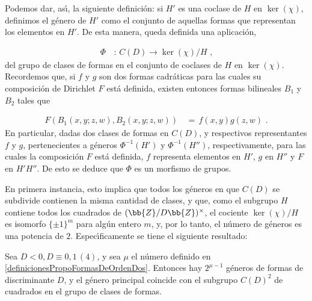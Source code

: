 Podemos dar, as\'{\i}, la siguiente definici\'{o}n: si $H'$ es una
coclase de $H$ en $\ker(\chi)$, definimos el g\'{e}nero de $H'$ como
el conjunto de aquellas formas que representan los elementos en $H'$.
De esta manera, queda definida una aplicaci\'{o}n,

\begin{align*}
\Phi & \,:\,C(D)\rightarrow\ker(\chi)/H\text{ ,}
\end{align*}
del grupo de clases de formas en el conjunto de coclases de $H$ en
$\ker(\chi)$. Recordemos que, si $f$ y $g$ son dos formas
cadr\'{a}ticas para las cuales su composici\'{o}n de Dirichlet $F$
est\'{a} definida, existen entonces formas bilineales $B_{1}$ y $B_{2}$
tales que

\begin{align*}
F(B_{1}(x,y;z,w),B_{2}(x,y;z,w)) & \,=\,f(x,y)g(z,w)\text{ .}
\end{align*}
En particular, dadas dos clases de formas en $C(D)$, y respectivos representantes $f$ y $g$, pertenecientes a g\'{e}neros
$\Phi^{-1}(H')$ y $\Phi^{-1}(H'')$, respectivamente, para las cuales
la composici\'{o}n $F$ est\'{a} definida, $f$ representa elementos en
$H'$, $g$ en $H''$ y $F$ en $H'H''$. De esto se deduce que $\Phi$ es
un morfismo de grupos.

En primera instancia, esto implica que todos los g\'{e}neros en que
$C(D)$ se subdivide contienen la misma cantidad de clases, y que,
como el subgrupo $H$ contiene todos los cuadrados de
$(\bb{Z}/D\bb{Z})^{\times}$, %
el cociente $\ker(\chi)/H$ es isomorfo $\{\pm 1\}^{m}$ para
alg\'{u}n entero $m$, y, por lo tanto, el n\'{u}mero de g\'{e}neros es
una potencia de $2$.
Espec\'{\i}ficamente se tiene el siguiente resultado:

\begin{definicionesGeneraYCuadrados}
Sea $D<0,D\equiv 0,1\,(4)$, y sea $\mu$ el n\'{u}mero definido en
\ref{definicionesPropoFormasDeOrdenDos}. Entonces hay $2^{\mu-1}$
g\'{e}neros de formas de discriminante $D$, y el g\'{e}nero principal
coincide con el subgrupo $C(D)^{2}$ de cuadrados en el grupo de
clases de formas.
\end{definicionesGeneraYCuadrados}